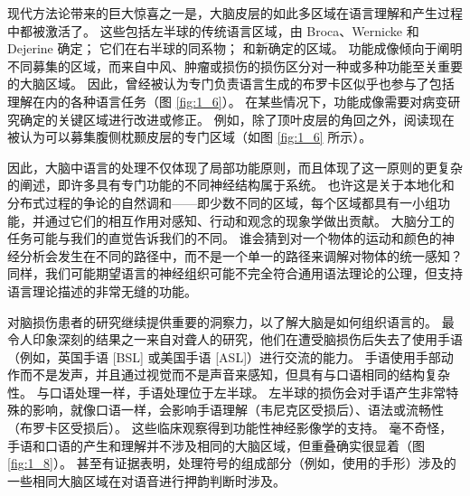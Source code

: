 现代方法论带来的巨大惊喜之一是，大脑皮层的如此多区域在语言理解和产生过程中都被激活了。 
这些包括左半球的传统语言区域，由 Broca、Wernicke 和 Dejerine 确定； 它们在右半球的同系物； 和新确定的区域。 
功能成像倾向于阐明不同募集的区域，而来自中风、肿瘤或损伤的损伤区分对一种或多种功能至关重要的大脑区域。 
因此，曾经被认为专门负责语言生成的布罗卡区似乎也参与了包括理解在内的各种语言任务（图 \ref{fig:1_6}）。 
在某些情况下，功能成像需要对病变研究确定的关键区域进行改进或修正。 
例如，除了顶叶皮层的角回之外，阅读现在被认为可以募集腹侧枕颞皮层的专门区域（如图 \ref{fig:1_6} 所示）。


因此，大脑中语言的处理不仅体现了局部功能原则，而且体现了这一原则的更复杂的阐述，即许多具有专门功能的不同神经结构属于系统。 
也许这是关于本地化和分布式过程的争论的自然调和——即少数不同的区域，每个区域都具有一小组功能，并通过它们的相互作用对感知、行动和观念的现象学做出贡献。 
大脑分工的任务可能与我们的直觉告诉我们的不同。 谁会猜到对一个物体的运动和颜色的神经分析会发生在不同的路径中，而不是一个单一的路径来调解对物体的统一感知？ 
同样，我们可能期望语言的神经组织可能不完全符合通用语法理论的公理，但支持语言理论描述的非常无缝的功能。


对脑损伤患者的研究继续提供重要的洞察力，以了解大脑是如何组织语言的。 
最令人印象深刻的结果之一来自对聋人的研究，他们在遭受脑损伤后失去了使用手语（例如，英国手语 [BSL] 或美国手语 [ASL]）进行交流的能力。 
手语使用手部动作而不是发声，并且通过视觉而不是声音来感知，但具有与口语相同的结构复杂性。 
与口语处理一样，手语处理位于左半球。 左半球的损伤会对手语产生非常特殊的影响，就像口语一样，会影响手语理解（韦尼克区受损后）、语法或流畅性（布罗卡区受损后）。 
这些临床观察得到功能性神经影像学的支持。 
毫不奇怪，手语和口语的产生和理解并不涉及相同的大脑区域，但重叠确实很显着（图 \ref{fig:1_8}）。 
甚至有证据表明，处理符号的组成部分（例如，使用的手形）涉及的一些相同大脑区域在对语音进行押韵判断时涉及。

